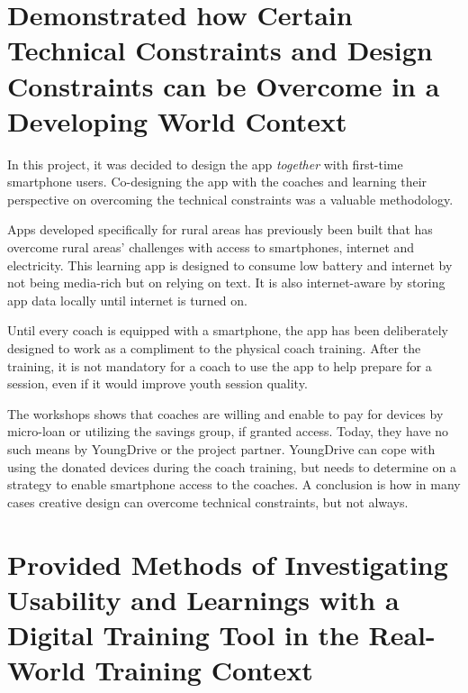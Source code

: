 \section{Demonstrated how Certain Technical Constraints and Design Constraints can be Overcome in a Developing World Context} %

In this project, it was decided to design the app \textit{together} with first-time smartphone users. Co-designing the app with the coaches and learning their perspective on overcoming the technical constraints was a valuable methodology.

Apps developed specifically for rural areas has previously been built that has overcome rural areas’ challenges with access to smartphones, internet and electricity. This learning app is designed to consume low battery and internet by not being media-rich but on relying on text. It is also internet-aware by storing app data locally until internet is turned on.

Until every coach is equipped with a smartphone, the app has been deliberately designed to work as a compliment to the physical coach training. After the training, it is not mandatory for a coach to use the app to help prepare for a session, even if it would improve youth session quality.

The workshops shows that coaches are willing and enable to pay for devices by micro-loan or utilizing the savings group, if granted access. Today, they have no such means by YoungDrive or the project partner. YoungDrive can cope with using the donated devices during the coach training, but needs to determine on a strategy to enable smartphone access to the coaches. A conclusion is how in many cases creative design can overcome technical constraints, but not always.


\section{Provided Methods of Investigating Usability and Learnings with a Digital Training Tool in the Real-World Training Context} %

